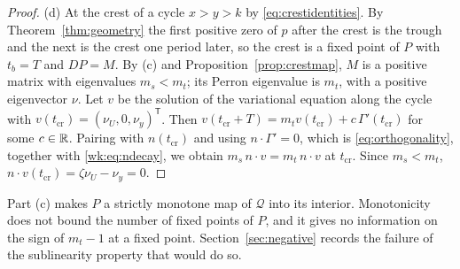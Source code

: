 \begin{proof}
(d) At the crest of a cycle $x>y>k$ by \eqref{eq:crestidentities}. By Theorem~\ref{thm:geometry} the first positive zero of $p$ after the crest is the trough and the next is the crest one period later, so the crest is a fixed point of $P$ with $t_b=T$ and $DP=M$. By (c) and Proposition~\ref{prop:crestmap}, $M$ is a positive matrix with eigenvalues $m_s<m_t$; its Perron eigenvalue is $m_t$, with a positive eigenvector $\nu$. Let $v$ be the solution of the variational equation along the cycle with $v(t_{\mathrm{cr}})=(\nu_U,0,\nu_y)^{\mathsf T}$. Then $v(t_{\mathrm{cr}}+T)=m_tv(t_{\mathrm{cr}})+c\,\Gamma'(t_{\mathrm{cr}})$ for some $c\in\mathbb R$. Pairing with $n(t_{\mathrm{cr}})$ and using $n\cdot\Gamma'=0$, which is \eqref{eq:orthogonality}, together with \eqref{wk:eq:ndecay}, we obtain $m_s\,n\cdot v=m_t\,n\cdot v$ at $t_{\mathrm{cr}}$. Since $m_s<m_t$, $n\cdot v(t_{\mathrm{cr}})=\zeta\nu_U-\nu_y=0$.
\end{proof}
Part (c) makes $P$ a strictly monotone map of $\mathcal Q$ into its interior. Monotonicity does not bound the number of fixed points of $P$, and it gives no information on the sign of $m_t-1$ at a fixed point. Section~\ref{sec:negative} records the failure of the sublinearity property that would do so.

